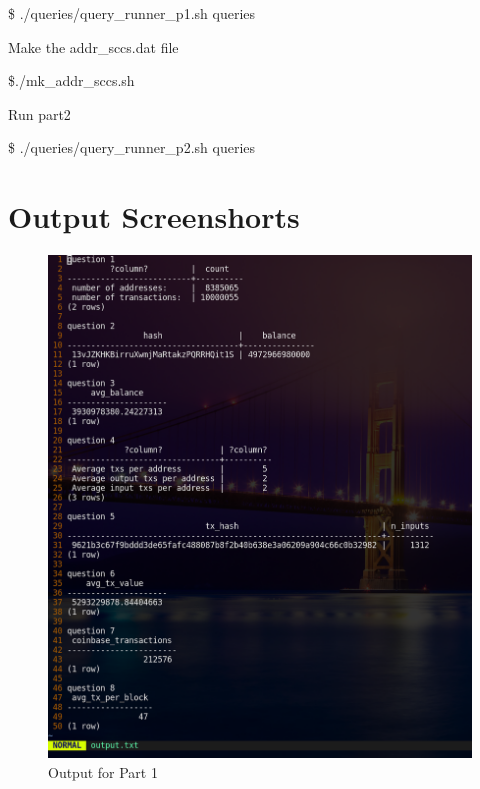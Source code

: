 \documentclass[conference,a4paper,12pt]{IEEEtran}
\begin{document}
	\$ ./queries/query\_runner\_p1.sh queries
	
	Make the addr\_sccs.dat file
	
	\$./mk\_addr\_sccs.sh
	
	Run part2
	
	\$ ./queries/query\_runner\_p2.sh queries

	
\section{Output Screenshorts}

	\begin{figure}[h!]
	  \includegraphics[width=\linewidth]{op1.png}
	  \caption{Output for Part 1}
	  \label{OP1}
	\end{figure}
	
\end{document}
